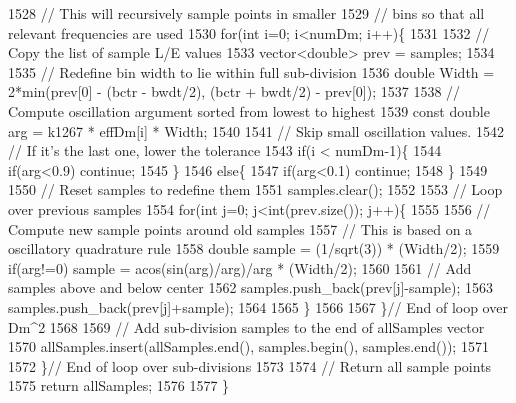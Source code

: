 \begin{DoxyCode}
1528     \textcolor{comment}{// This will recursively sample points in smaller}
1529     \textcolor{comment}{// bins so that all relevant frequencies are used}
1530     \textcolor{keywordflow}{for}(\textcolor{keywordtype}{int} i=0; i<numDm; i++)\{
1531 
1532       \textcolor{comment}{// Copy the list of sample L/E values}
1533       vector<double> prev = samples;
1534 
1535       \textcolor{comment}{// Redefine bin width to lie within full sub-division}
1536       \textcolor{keywordtype}{double} Width = 2*min(prev[0] - (bctr - bwdt/2), (bctr + bwdt/2) - prev[0]);
1537 
1538       \textcolor{comment}{// Compute oscillation argument sorted from lowest  to highest}
1539       \textcolor{keyword}{const} \textcolor{keywordtype}{double} arg = k1267 * effDm[i] * Width;
1540 
1541       \textcolor{comment}{// Skip small oscillation values.}
1542       \textcolor{comment}{// If it's the last one, lower the tolerance}
1543       \textcolor{keywordflow}{if}(i < numDm-1)\{
1544         \textcolor{keywordflow}{if}(arg<0.9) \textcolor{keywordflow}{continue};
1545       \}
1546       \textcolor{keywordflow}{else}\{
1547         \textcolor{keywordflow}{if}(arg<0.1) \textcolor{keywordflow}{continue};
1548       \}
1549 
1550       \textcolor{comment}{// Reset samples to redefine them}
1551       samples.clear();
1552 
1553       \textcolor{comment}{// Loop over previous samples}
1554       \textcolor{keywordflow}{for}(\textcolor{keywordtype}{int} j=0; j<int(prev.size()); j++)\{
1555 
1556         \textcolor{comment}{// Compute new sample points around old samples}
1557         \textcolor{comment}{// This is based on a oscillatory quadrature rule}
1558         \textcolor{keywordtype}{double} sample = (1/sqrt(3)) * (Width/2);
1559         \textcolor{keywordflow}{if}(arg!=0) sample = acos(sin(arg)/arg)/arg * (Width/2);
1560 
1561         \textcolor{comment}{// Add samples above and below center}
1562         samples.push\_back(prev[j]-sample);
1563         samples.push\_back(prev[j]+sample);
1564 
1565       \}
1566 
1567     \}\textcolor{comment}{// End of loop over Dm^2}
1568 
1569     \textcolor{comment}{// Add sub-division samples to the end of allSamples vector}
1570     allSamples.insert(allSamples.end(), samples.begin(), samples.end());
1571 
1572   \}\textcolor{comment}{// End of loop over sub-divisions}
1573 
1574   \textcolor{comment}{// Return all sample points}
1575   \textcolor{keywordflow}{return} allSamples;
1576 
1577 \}
\end{DoxyCode}
\mbox{\label{classOscProb_1_1PMNS__NSI_a5fbeeb25bd00fbda7c484dbdb6748a58}} 
